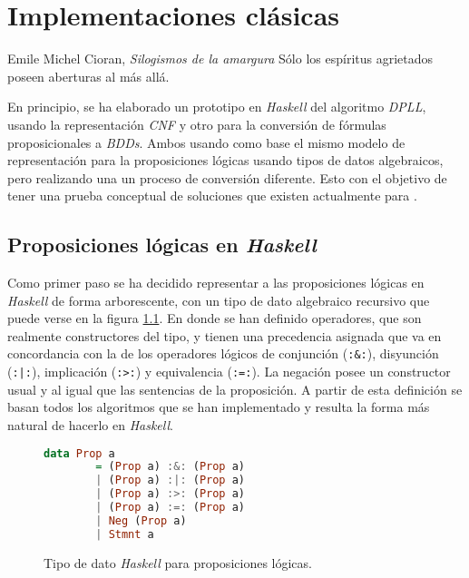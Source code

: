 \chapter{Implementaciones clásicas}

\begin{chapquote}{Emile Michel Cioran, \textit{Silogismos de la amargura}}
Sólo los espíritus agrietados poseen aberturas al más allá.
\end{chapquote}

En principio, se ha elaborado un prototipo en \textit{Haskell} del algoritmo \textit{DPLL}, usando la representación \textit{CNF} y otro para la conversión de fórmulas proposicionales a \textit{BDDs}. Ambos usando como base el mismo modelo de representación para la proposiciones lógicas usando tipos de datos algebraicos, pero realizando una un proceso de conversión diferente. Esto con el objetivo de tener una prueba conceptual de soluciones que existen actualmente para \sat.

\section{Proposiciones lógicas en \textit{Haskell}}
\label{sec:data}

Como primer paso se ha decidido representar a las proposiciones lógicas en \textit{Haskell} de forma arborescente, con un tipo de dato algebraico recursivo que puede verse en la figura \ref{code:prop}. En donde se han definido operadores, que son realmente constructores del tipo, y tienen una precedencia asignada que va en concordancia con la de los operadores lógicos de conjunción (\texttt{:\&:}), disyunción (\texttt{:|:}), implicación (\texttt{:>:}) y equivalencia (\texttt{:=:}). La negación posee un constructor usual y al igual que las sentencias de la proposición. A partir de esta definición se basan todos los algoritmos que se han implementado y resulta la forma más natural de hacerlo en \textit{Haskell}.

\begin{figure}
\begin{lstlisting}[language=Haskell]
    data Prop a
        = (Prop a) :&: (Prop a)
        | (Prop a) :|: (Prop a)
        | (Prop a) :>: (Prop a)
        | (Prop a) :=: (Prop a)
        | Neg (Prop a)
        | Stmnt a
\end{lstlisting}
\caption{Tipo de dato \textit{Haskell} para proposiciones lógicas.}
\label{code:prop}
\end{figure}

